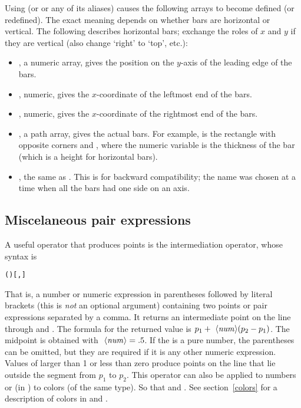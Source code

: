 \documentclass[letterpaper]{article}
\begin{document}
Using  (or  or any of its aliases) causes
the following arrays to become defined (or redefined). The exact meaning
depends on whether bars are horizontal or vertical. The following
describes horizontal bars; exchange the roles of $x$ and $y$ if they are
vertical (also change `right' to `top', etc.):
\begin{itemize}
  \item {}, a numeric array, gives the position on the
        $y$-axis of the leading edge of the bars.
  \item {}, numeric, gives the $x$-coordinate of the
        leftmost end of the bars.
  \item {}, numeric, gives the $x$-coordinate of the rightmost
        end of the bars.
  \item {}, a path array, gives the actual bars. For
        example,  is the rectangle with opposite corners
         and ,
        where the numeric variable  is the thickness of the
        bar (which is a height for horizontal bars).
  \item {}, the same as . This is for backward
        compatibility; the name was chosen at a time when all the bars
        had one side on an axis.
\end{itemize}


\subsection{Miscelaneous pair expressions}\label{pairexpressions}

A useful \MF{} operator that produces points is the intermediation
operator, whose syntax is
\begin{cd}
\texttt{()[,]}
\end{cd}
That is, a number or numeric expression in parentheses followed by
literal brackets (this is \emph{not} an optional argument) containing
two points or pair expressions separated by a comma. It returns an
intermediate point on the line through  and .
The formula for the returned value is $p_1 + \mbox{ \ensuremath{\langle\mbox{\rmfamily\itshape num\/}\rangle}}(p_2 -
p_1)$. The midpoint is obtained with $\mbox{ \ensuremath{\langle\mbox{\rmfamily\itshape num\/}\rangle}} = .5$. If the
 is a pure number, the parentheses can be omitted, but they
are required if it is any other numeric expression. Values of 
larger than 1 or less than zero produce points on the line that lie
outside the segment from $p_1$ to $p_2$. This operator can also be
applied to numbers or (in \MP{}) to colors (of the same type). So that
 and .  See
section~\ref{colors} for a description of colors in \MP{} and \MF{}.
\end{document}
